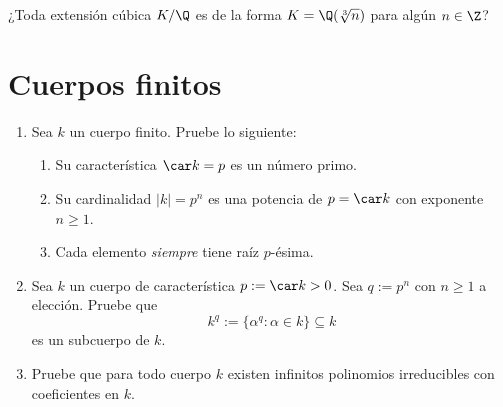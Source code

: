 \documentclass[11pt, reqno]{amsart}
\begin{document}
\begin{prob}
	\lookst
	¿Toda extensión cúbica $K/\Q$ es de la forma $K = \Q(\sqrt[3]{n})$ para algún $n \in \Z$?
\end{prob}

\section{Cuerpos finitos}
\begin{enumerate}[resume]
	\item Sea $k$ un cuerpo finito. Pruebe lo siguiente:
		\begin{enumerate}
			\item Su característica $\car k = p$ es un número primo.
			\item Su cardinalidad $|k| = p^n$ es una potencia de $p = \car k$ con exponente $n \ge 1$.
			\item Cada elemento \emph{siempre} tiene raíz $p$-ésima.
		\end{enumerate}

	\item Sea $k$ un cuerpo de característica $p := \car k > 0$.
		Sea $q := p^n$ con $n \ge 1$ a elección.
		Pruebe que
		\[
			k^q := \{ \alpha^q : \alpha \in k \} \subseteq k
		\]
		es un subcuerpo de $k$.

	\item \lookright
		Pruebe que para todo cuerpo $k$ existen infinitos polinomios irreducibles con coeficientes en $k$.


\end{enumerate}

\nocite{lang:algebra}

\printbibliography
\end{document}
